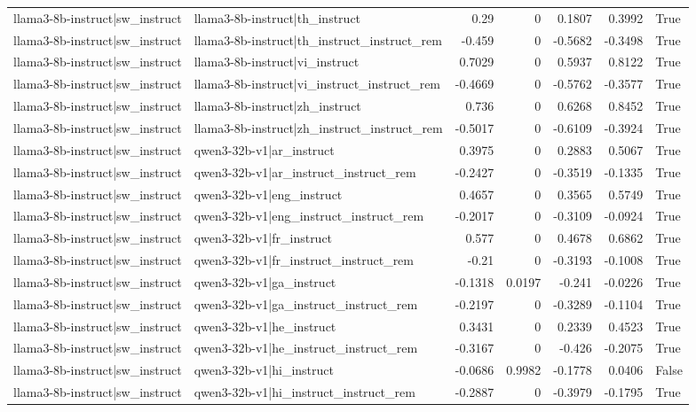 \begin{table}
\begin{tabular}{l l r r r r l}
llama3-8b-instruct|sw_instruct & llama3-8b-instruct|th_instruct & 0.29 & 0 & 0.1807 & 0.3992 & True \\
llama3-8b-instruct|sw_instruct & llama3-8b-instruct|th_instruct_instruct_rem & -0.459 & 0 & -0.5682 & -0.3498 & True \\
llama3-8b-instruct|sw_instruct & llama3-8b-instruct|vi_instruct & 0.7029 & 0 & 0.5937 & 0.8122 & True \\
llama3-8b-instruct|sw_instruct & llama3-8b-instruct|vi_instruct_instruct_rem & -0.4669 & 0 & -0.5762 & -0.3577 & True \\
llama3-8b-instruct|sw_instruct & llama3-8b-instruct|zh_instruct & 0.736 & 0 & 0.6268 & 0.8452 & True \\
llama3-8b-instruct|sw_instruct & llama3-8b-instruct|zh_instruct_instruct_rem & -0.5017 & 0 & -0.6109 & -0.3924 & True \\
llama3-8b-instruct|sw_instruct & qwen3-32b-v1|ar_instruct & 0.3975 & 0 & 0.2883 & 0.5067 & True \\
llama3-8b-instruct|sw_instruct & qwen3-32b-v1|ar_instruct_instruct_rem & -0.2427 & 0 & -0.3519 & -0.1335 & True \\
llama3-8b-instruct|sw_instruct & qwen3-32b-v1|eng_instruct & 0.4657 & 0 & 0.3565 & 0.5749 & True \\
llama3-8b-instruct|sw_instruct & qwen3-32b-v1|eng_instruct_instruct_rem & -0.2017 & 0 & -0.3109 & -0.0924 & True \\
llama3-8b-instruct|sw_instruct & qwen3-32b-v1|fr_instruct & 0.577 & 0 & 0.4678 & 0.6862 & True \\
llama3-8b-instruct|sw_instruct & qwen3-32b-v1|fr_instruct_instruct_rem & -0.21 & 0 & -0.3193 & -0.1008 & True \\
llama3-8b-instruct|sw_instruct & qwen3-32b-v1|ga_instruct & -0.1318 & 0.0197 & -0.241 & -0.0226 & True \\
llama3-8b-instruct|sw_instruct & qwen3-32b-v1|ga_instruct_instruct_rem & -0.2197 & 0 & -0.3289 & -0.1104 & True \\
llama3-8b-instruct|sw_instruct & qwen3-32b-v1|he_instruct & 0.3431 & 0 & 0.2339 & 0.4523 & True \\
llama3-8b-instruct|sw_instruct & qwen3-32b-v1|he_instruct_instruct_rem & -0.3167 & 0 & -0.426 & -0.2075 & True \\
llama3-8b-instruct|sw_instruct & qwen3-32b-v1|hi_instruct & -0.0686 & 0.9982 & -0.1778 & 0.0406 & False \\
llama3-8b-instruct|sw_instruct & qwen3-32b-v1|hi_instruct_instruct_rem & -0.2887 & 0 & -0.3979 & -0.1795 & True \\

\end{tabular}
\end{table}
